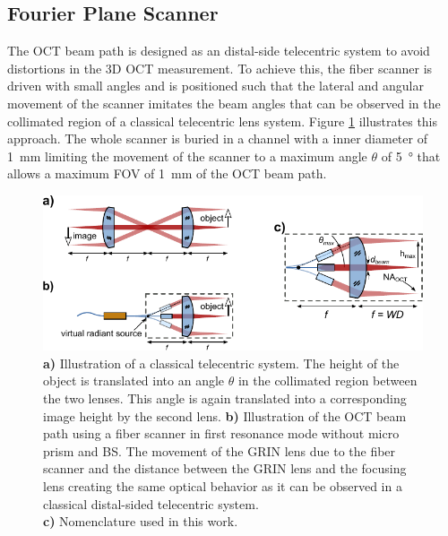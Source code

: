 \subsection{Fourier Plane Scanner}



The OCT beam path is designed as an distal-side telecentric system to avoid distortions in the 3D OCT measurement. To achieve this, the fiber scanner is driven with small angles and is positioned such that the lateral and angular movement of the scanner imitates the beam angles that can be observed in the collimated region of a classical telecentric lens system. Figure \ref{fig:fps} illustrates this approach. The whole scanner is buried in a channel with a inner diameter of \SI{1}{\milli\meter} limiting the movement of the scanner to a maximum angle $\theta$ of \SI{5}{\degree} that allows a maximum FOV of \SI{1}{\milli\meter} of the OCT beam path.


\begin{figure}[h!]\centering \includegraphics[width=\columnwidth]{figures/30_DesignSimulation/fps.pdf}
      \caption{\textbf{a)} Illustration of a classical telecentric system. The height of the object is translated into an angle $\theta$ in the collimated region between the two lenses. This angle is again translated into a corresponding image height by the second lens.
      \textbf{b)} Illustration of the OCT beam path using a fiber scanner in first resonance mode without micro prism and BS. The movement of the GRIN lens due to the fiber scanner and the distance between the GRIN lens and the focusing lens creating the same optical behavior as it can be observed in a classical distal-sided telecentric system. \\ \textbf{c)} Nomenclature used in this work.}
      \label{fig:fps}
\end{figure}

